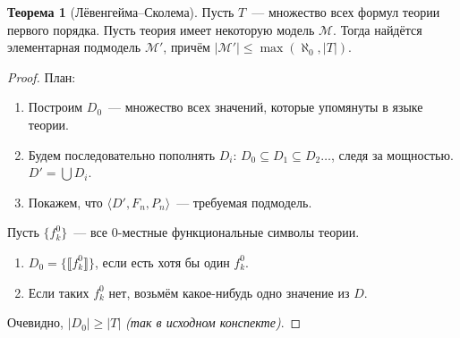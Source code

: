 \documentclass[a4paper,11pt]{article}
\theoremstyle{definition}
\newtheorem*{thm}{Теорема}
\begin{document}
\begin{thm}[Лёвенгейма--Сколема]
Пусть $T$~--- множество всех формул теории первого порядка. Пусть теория имеет
некоторую модель $\mathcal{M}$. Тогда найдётся элементарная подмодель
$\mathcal{M}'$, причём $|\mathcal{M}'| \le \max(\aleph_0, |T|)$.
\end{thm}
\begin{proof}
План:
\begin{enumerate}
\item Построим $D_0$~--- множество всех значений, которые упомянуты в языке
  теории.
\item Будем последовательно пополнять $D_i$: $D_0 \subseteq D_1 \subseteq D_2
  \dots$, следя за мощностью. $D' = \bigcup D_i$.
\item Покажем, что $\langle D', F_n, P_n\rangle$~--- требуемая подмодель.
\end{enumerate}
Пусть $\{f^0_k\}$~--- все 0-местные функциональные символы теории.
\begin{enumerate}
\item $D_0 = \{\llbracket f^0_k\rrbracket\}$, если есть хотя бы один $f^0_k$.
\item Если таких $f^0_k$ нет, возьмём какое-нибудь одно значение из $D$.
\end{enumerate}
Очевидно, $|D_0| \ge |T|$ \emph{(так в исходном конспекте)}.


\end{proof}
\end{document}
